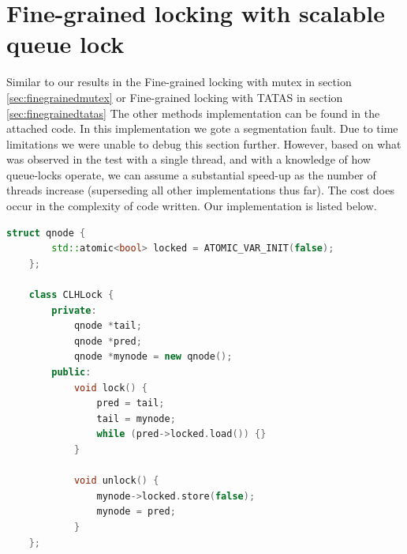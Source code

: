 \section{Fine-grained locking with scalable queue lock}

Similar to our results in the Fine-grained locking with mutex in section \ref{sec:finegrainedmutex} or Fine-grained locking with TATAS in section \ref{sec:finegrainedtatas}
The other methods implementation can be found in the attached code.
In this implementation we gote a segmentation fault. Due to time limitations we were unable to debug this section further. 
However, based on what was observed in the test with a single thread, and with a knowledge of how queue-locks operate, 
we can assume a substantial speed-up as the number of threads increase (superseding all other implementations thus far). 
The cost does occur in the complexity of code written. Our implementation is listed
below.

\begin{lstlisting}[language=C++, caption=The sholution we had in mind for queue lock]
	struct qnode {
		std::atomic<bool> locked = ATOMIC_VAR_INIT(false);
	};
	
	class CLHLock {
		private:
			qnode *tail;
			qnode *pred;
			qnode *mynode = new qnode();
		public:
			void lock() {
				pred = tail;
				tail = mynode;
				while (pred->locked.load()) {}
			}
			
			void unlock() {
				mynode->locked.store(false);
				mynode = pred;
			}
	};
	\end{lstlisting}
	
